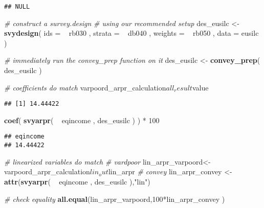 \documentclass[]{book}
\newenvironment{Shaded}{\begin{snugshade}}{\end{snugshade}}
\newcommand{\KeywordTok}[1]{\textcolor[rgb]{0.13,0.29,0.53}{\textbf{{#1}}}}
\newcommand{\DataTypeTok}[1]{\textcolor[rgb]{0.13,0.29,0.53}{{#1}}}
\newcommand{\DecValTok}[1]{\textcolor[rgb]{0.00,0.00,0.81}{{#1}}}
\newcommand{\StringTok}[1]{\textcolor[rgb]{0.31,0.60,0.02}{{#1}}}
\newcommand{\CommentTok}[1]{\textcolor[rgb]{0.56,0.35,0.01}{\textit{{#1}}}}
\newcommand{\NormalTok}[1]{{#1}}
\begin{document}
\begin{verbatim}
## NULL
\end{verbatim}

\begin{Shaded}
\begin{Highlighting}[]
\CommentTok{# construct a survey.design}
\CommentTok{# using our recommended setup}
\NormalTok{des_eusilc <-}\StringTok{ }
\StringTok{    }\KeywordTok{svydesign}\NormalTok{( }
        \DataTypeTok{ids =} \NormalTok{~}\StringTok{ }\NormalTok{rb030 , }
        \DataTypeTok{strata =} \NormalTok{~}\StringTok{ }\NormalTok{db040 ,  }
        \DataTypeTok{weights =} \NormalTok{~}\StringTok{ }\NormalTok{rb050 , }
        \DataTypeTok{data =} \NormalTok{eusilc}
    \NormalTok{)}

\CommentTok{# immediately run the convey_prep function on it}
\NormalTok{des_eusilc <-}\StringTok{ }\KeywordTok{convey_prep}\NormalTok{( des_eusilc )}

\CommentTok{# coefficients do match}
\NormalTok{varpoord_arpr_calculation$all_result$value}
\end{Highlighting}
\end{Shaded}

\begin{verbatim}
## [1] 14.44422
\end{verbatim}

\begin{Shaded}
\begin{Highlighting}[]
\KeywordTok{coef}\NormalTok{( }\KeywordTok{svyarpr}\NormalTok{( ~}\StringTok{ }\NormalTok{eqincome , des_eusilc ) ) *}\StringTok{ }\DecValTok{100}
\end{Highlighting}
\end{Shaded}

\begin{verbatim}
## eqincome 
## 14.44422
\end{verbatim}

\begin{Shaded}
\begin{Highlighting}[]
\CommentTok{# linearized variables do match}
\CommentTok{# vardpoor}
\NormalTok{lin_arpr_varpoord<-}\StringTok{ }\NormalTok{varpoord_arpr_calculation$lin_out$lin_arpr}
\CommentTok{# convey }
\NormalTok{lin_arpr_convey <-}\StringTok{ }\KeywordTok{attr}\NormalTok{(}\KeywordTok{svyarpr}\NormalTok{( ~}\StringTok{ }\NormalTok{eqincome , des_eusilc ),}\StringTok{"lin"}\NormalTok{)}

\CommentTok{# check equality}
\KeywordTok{all.equal}\NormalTok{(lin_arpr_varpoord,}\DecValTok{100}\NormalTok{*lin_arpr_convey )}
\end{Highlighting}
\end{Shaded}
\end{document}
